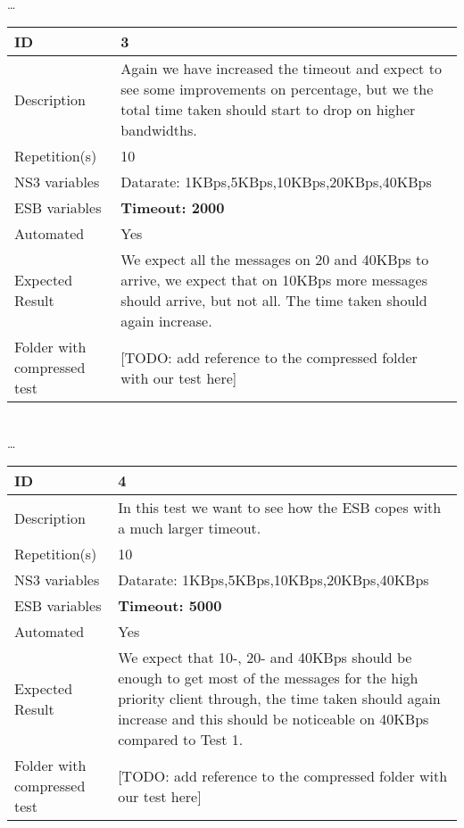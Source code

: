 \begin{center}
\\ \ldots \\

\begin{tabular}{| p{4cm} | p{8cm} |}%
	\hline
	ID & 3 \\
	\hline
	Description & Again we have increased the timeout and expect to see some improvements on percentage, but we the total time taken should start to drop on higher bandwidths.  \\
	\hline
	Repetition(s) & 10 \\
	\hline
	NS3 variables & Datarate: 1KBps,5KBps,10KBps,20KBps,40KBps \\
	\hline
	ESB variables & \textbf{Timeout: 2000} \\
	\hline
	Automated & Yes \\
	\hline
	Expected Result & We expect all the messages on 20 and 40KBps to arrive, we expect that on 10KBps more messages should arrive, but not all. The time taken should again increase. \\
	\hline
	Folder with compressed test & [TODO: add reference to the compressed folder with our test here]\\
	\hline
\end{tabular}

\\ \ldots \\

\begin{tabular}{| p{4cm} | p{8cm} |}%
	\hline
	ID & 4 \\
	\hline
	Description & In this test we want to see how the ESB copes with a much larger timeout.  \\
	\hline
	Repetition(s) & 10 \\
	\hline
	NS3 variables & Datarate: 1KBps,5KBps,10KBps,20KBps,40KBps \\
	\hline
	ESB variables & \textbf{Timeout: 5000} \\
	\hline
	Automated & Yes \\
	\hline
	Expected Result & We expect that 10-, 20- and 40KBps should be enough to get most of the messages for the high priority client through, the time taken should again increase and this should be noticeable on 40KBps compared to Test 1.  \\
	\hline
	Folder with compressed test & [TODO: add reference to the compressed folder with our test here]\\
	\hline
\end{tabular}


\end{center}
